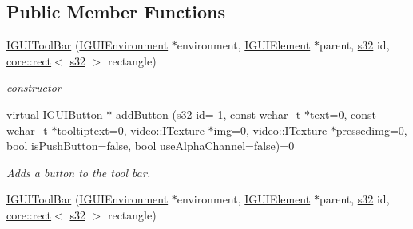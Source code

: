\subsection*{Public Member Functions}
\begin{DoxyCompactItemize}
\item 
\mbox{\label{classirr_1_1gui_1_1IGUIToolBar_af58b2fe4ddf884e763882ac380753d37}} 
\hyperlink{classirr_1_1gui_1_1IGUIToolBar_af58b2fe4ddf884e763882ac380753d37}{I\+G\+U\+I\+Tool\+Bar} (\hyperlink{classirr_1_1gui_1_1IGUIEnvironment}{I\+G\+U\+I\+Environment} $\ast$environment, \hyperlink{classirr_1_1gui_1_1IGUIElement}{I\+G\+U\+I\+Element} $\ast$parent, \hyperlink{namespaceirr_ac66849b7a6ed16e30ebede579f9b47c6}{s32} id, \hyperlink{classirr_1_1core_1_1rect}{core\+::rect}$<$ \hyperlink{namespaceirr_ac66849b7a6ed16e30ebede579f9b47c6}{s32} $>$ rectangle)
\begin{DoxyCompactList}\small\item\em constructor \end{DoxyCompactList}\item 
\mbox{\label{classirr_1_1gui_1_1IGUIToolBar_ae7072e7db92448c0feca015d358a8fe4}} 
virtual \hyperlink{classirr_1_1gui_1_1IGUIButton}{I\+G\+U\+I\+Button} $\ast$ \hyperlink{classirr_1_1gui_1_1IGUIToolBar_ae7072e7db92448c0feca015d358a8fe4}{add\+Button} (\hyperlink{namespaceirr_ac66849b7a6ed16e30ebede579f9b47c6}{s32} id=-\/1, const wchar\+\_\+t $\ast$text=0, const wchar\+\_\+t $\ast$tooltiptext=0, \hyperlink{classirr_1_1video_1_1ITexture}{video\+::\+I\+Texture} $\ast$img=0, \hyperlink{classirr_1_1video_1_1ITexture}{video\+::\+I\+Texture} $\ast$pressedimg=0, bool is\+Push\+Button=false, bool use\+Alpha\+Channel=false)=0
\begin{DoxyCompactList}\small\item\em Adds a button to the tool bar. \end{DoxyCompactList}\item 
\mbox{\label{classirr_1_1gui_1_1IGUIToolBar_af58b2fe4ddf884e763882ac380753d37}} 
\hyperlink{classirr_1_1gui_1_1IGUIToolBar_af58b2fe4ddf884e763882ac380753d37}{I\+G\+U\+I\+Tool\+Bar} (\hyperlink{classirr_1_1gui_1_1IGUIEnvironment}{I\+G\+U\+I\+Environment} $\ast$environment, \hyperlink{classirr_1_1gui_1_1IGUIElement}{I\+G\+U\+I\+Element} $\ast$parent, \hyperlink{namespaceirr_ac66849b7a6ed16e30ebede579f9b47c6}{s32} id, \hyperlink{classirr_1_1core_1_1rect}{core\+::rect}$<$ \hyperlink{namespaceirr_ac66849b7a6ed16e30ebede579f9b47c6}{s32} $>$ rectangle)

\end{DoxyCompactItemize}

